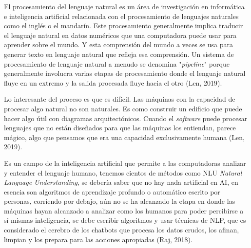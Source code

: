 \documentclass[letter, openright, 12pt]{book}
\begin{document}
El procesamiento del lenguaje natural es un área de investigación en informática e inteligencia artificial relacionada con el procesamiento de lenguajes naturales como el inglés o el mandarín. Este procesamiento generalmente implica traducir el lenguaje natural en datos numéricos que una computadora puede usar para aprender sobre el mundo. Y esta comprensión del mundo a veces se usa para generar texto en lenguaje natural que refleja esa comprensión. Un sistema de procesamiento de lenguaje natural a menudo se denomina "\textit{pipeline}" porque generalmente involucra varias etapas de procesamiento donde el lenguaje natural fluye en un extremo y la salida procesada fluye hacia el otro (Len, 2019).
\par 
Lo interesante del proceso es que es difícil. Las máquinas con la capacidad de procesar algo natural no son naturales. Es como construir un edificio que puede hacer algo útil con diagramas arquitectónicos. Cuando el \textit{software} puede procesar lenguajes que no están diseñados para que las máquinas los entiendan, parece mágico, algo que pensamos que era una capacidad exclusivamente humana (Len, 2019).
\par 
Es un campo de la inteligencia artificial que permite a las computadoras analizar y entender el lenguaje humano, tenemos cientos de métodos como NLU \textit{Natural Language Understanding}, se debería saber que no hay nada artificial en AI, en esencia son algoritmos de aprendizaje profundo o automático escrito por personas, corriendo por debajo, aún no se ha alcanzado la etapa en donde las máquinas hayan alcanzado a analizar como los humanos para poder percibirse a sí mismas inteligencia, se debe escribir algoritmos y usar técnicas de NLP, que es considerado el cerebro de los chatbots que procesa los datos crudos, los afinan, limpian y los prepara para las acciones apropiadas (Raj, 2018).
\end{document}
